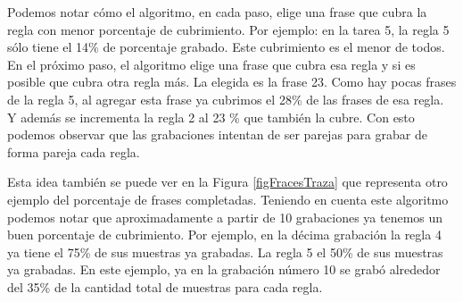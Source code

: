 \normalsize

Podemos notar cómo el algoritmo, en cada paso, elige una frase que cubra la regla con menor porcentaje de cubrimiento. Por ejemplo: en la tarea 5, la regla 5 sólo tiene el 14\% de porcentaje grabado. Este cubrimiento es el menor de todos. En el próximo paso, el algoritmo elige una frase que cubra esa regla y si es posible que cubra otra regla más. La elegida es la frase 23. Como hay pocas frases de la regla 5, al agregar esta frase ya cubrimos el 28\% de las frases de esa regla. Y además se incrementa la regla 2 al 23 \% que también la cubre. Con esto podemos observar que las grabaciones intentan de ser parejas para grabar de forma pareja cada regla.

Esta idea también se puede ver en la Figura \ref{figFracesTraza} que representa otro ejemplo del porcentaje de frases completadas. Teniendo en cuenta este algoritmo podemos notar que aproximadamente a partir de 10 grabaciones ya tenemos un buen porcentaje de cubrimiento. Por ejemplo, en la décima grabación la regla 4 ya tiene el 75\% de sus muestras ya grabadas. La regla 5 el 50\% de sus muestras ya grabadas. En este ejemplo, ya en la grabación número 10 se grabó alrededor del 35\% de la cantidad total de muestras para cada regla.


